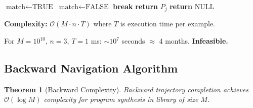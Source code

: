 \documentclass[twocolumn,10pt]{revtex4-2}
\newtheorem{theorem}{Theorem}[section]
\theoremstyle{definition}
\theoremstyle{remark}
\newcommand{\bigO}{\mathcal{O}}
\begin{document}
\begin{algorithm}
\caption{Forward Search}
\begin{algorithmic}[1]
  \STATE $\text{match} \leftarrow \text{TRUE}$
      \STATE $\text{match} \leftarrow \text{FALSE}$
      \STATE \textbf{break}
    \ENDIF
  \ENDFOR
    \STATE \textbf{return} $P_j$
  \ENDIF
\ENDFOR
\STATE \textbf{return} NULL
\end{algorithmic}
\end{algorithm}

\textbf{Complexity:} $\bigO(M \cdot n \cdot T)$ where $T$ is execution time per example.

For $M = 10^{10}$, $n = 3$, $T = 1$ ms: $\sim 10^7$ seconds $\approx$ 4 months. \textbf{Infeasible.}

\subsection{Backward Navigation Algorithm}

\begin{theorem}[Backward Complexity]
\label{thm:backward_complexity}
Backward trajectory completion achieves $\bigO(\log M)$ complexity for program synthesis in library of size $M$.
\end{theorem}
\end{document}
